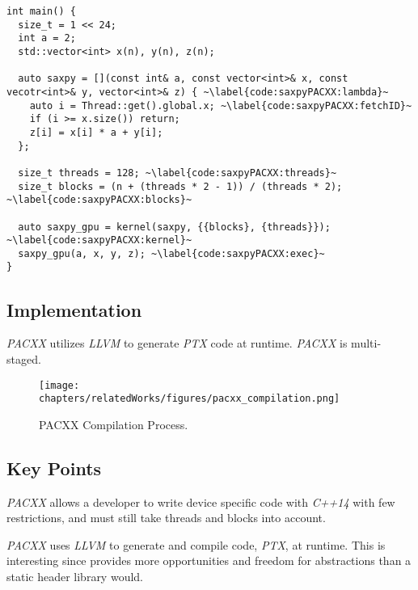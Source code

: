\begin{lstlisting}[caption={\textit{SAXPY} implementation made with \textit{PACXX}.}, label={code:saxpyPACXX}]
int main() {
  size_t = 1 << 24;
  int a = 2;
  std::vector<int> x(n), y(n), z(n);

  auto saxpy = [](const int& a, const vector<int>& x, const vecotr<int>& y, vector<int>& z) { ~\label{code:saxpyPACXX:lambda}~
    auto i = Thread::get().global.x; ~\label{code:saxpyPACXX:fetchID}~
    if (i >= x.size()) return;
    z[i] = x[i] * a + y[i];
  };

  size_t threads = 128; ~\label{code:saxpyPACXX:threads}~
  size_t blocks = (n + (threads * 2 - 1)) / (threads * 2); ~\label{code:saxpyPACXX:blocks}~

  auto saxpy_gpu = kernel(saxpy, {{blocks}, {threads}}); ~\label{code:saxpyPACXX:kernel}~
  saxpy_gpu(a, x, y, z); ~\label{code:saxpyPACXX:exec}~
}
\end{lstlisting}

\subsection{Implementation}
\textit{PACXX} utilizes \textit{LLVM} to generate \textit{PTX} code at runtime. \textit{PACXX} is multi-staged.
\begin{figure}
\center
\texttt{[image: chapters/relatedWorks/figures/pacxx\_compilation.png]}
\caption{PACXX Compilation Process.}
\label{fig:pacxxCompilation}
\end{figure}

\subsection{Key Points}
\textit{PACXX} allows a developer to write device specific code with \textit{C++14} with few restrictions, and must still take threads and blocks into account. 

\textit{PACXX} uses \textit{LLVM} to generate and compile code, \textit{PTX}, at runtime. This is interesting since provides more opportunities and freedom for abstractions than a static header library would.
